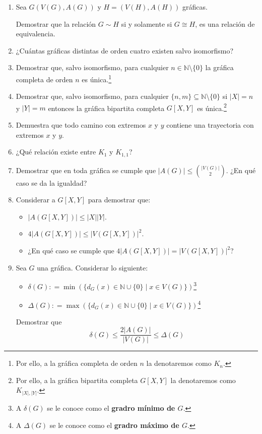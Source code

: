 \documentclass[10pt]{report}
\numberwithin{section}{chapter}
\newcommand{\N}{\mathbb N}
\begin{document}
\begin{enumerate}
\item Sea $G(V(G), A(G))$ y $H=(V(H), A(H))$ gráficas.

Demostrar que la relación $G \sim H$ si y solamente si $G \cong H$, es una relación de equivalencia.

\item ¿Cuántas gráficas distintas de orden cuatro existen salvo isomorfismo?

\item Demostrar que, salvo isomorfismo, para cualquier $n \in \N \setminus\{0\}$ la gráfica completa de orden $n$ es única.\footnote{Por ello, a la gráfica completa de orden $n$ la denotaremos como $K_n$.}

\item Demostrar que, salvo isomorfismo, para cualquier $\{n,m\} \subseteq \N \setminus\{0\}$ si $|X| = n$ y $|Y|=m$ entonces la gráfica bipartita completa $G[X,Y]$ es única.\footnote{Por ello, a la gráfica bipartita completa $G[X,Y]$ la denotaremos como $K_{|X|,|Y|}$.}


\item Demuestra que todo camino con extremos $x$ y $y$ contiene una trayectoria con extremos $x$ y $y$.

\item ¿Qué relación existe entre $K_1$ y $K_{1,1}$?

\item Demostrar que en toda gráfica se cumple que $|A(G)| \leq {|V(G)|\choose 2}$. ¿En qué caso se da la igualdad?

\item Considerar a $G[X,Y]$ para demostrar que:
\begin{itemize}
\item $|A(G[X,Y])| \leq |X||Y|$.
\item $4 |A(G[X,Y])| \leq |V(G[X,Y])|^2$.
\item ¿En qué caso se cumple que $4 |A(G[X,Y])| = |V(G[X,Y])|^2$?
\end{itemize}

\item Sea $G$ una gráfica. Considerar lo siguiente:
\begin{itemize}
\item $\delta (G) : = \min(\{d_G(x) \in \N \cup \{0\} \; | \; x \in V(G) \})$\footnote{A $\delta(G)$ se le conoce como el \textbf{gradro mínimo de $G$}.}
\item $\Delta (G) : = \max(\{d_G(x) \in \N \cup \{0\} \; | \; x \in V(G) \})$\footnote{A $\Delta(G)$ se le conoce como el \textbf{gradro máximo de $G$}.}
\end{itemize}
Demostrar que $$ \delta(G) \leq \frac{2 |A(G)|}{|V(G)|} \leq \Delta(G)$$


\end{enumerate}
\end{document}
